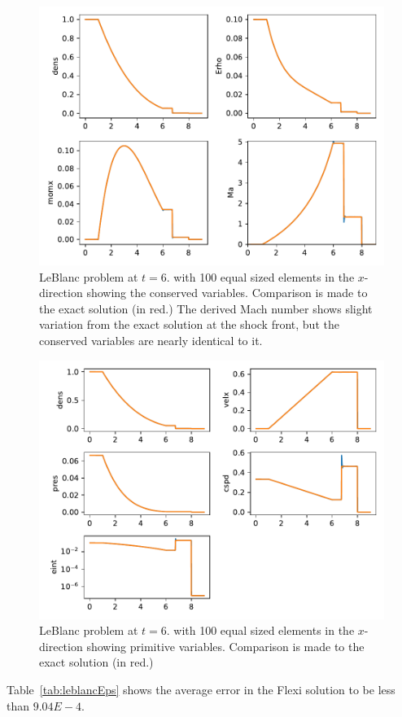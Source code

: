 \begin{figure}[h!]
 \centering
 \includegraphics[scale=0.8]{figures/leblanc-CV.pdf}
 \caption{LeBlanc problem at $t = 6.$ with 100 equal sized elements in the $x$-direction showing the conserved variables.  Comparison is made to the exact solution (in red.)  The derived Mach number shows slight variation from the exact solution at the shock front, but the conserved variables are nearly identical to it.}
 \label{fig:CVleblanc}
\end{figure}

\begin{figure}[h!]
 \centering
 \includegraphics[scale=0.8]{figures/leblanc-PV.pdf}
 \caption{LeBlanc problem at $t = 6.$ with 100 equal sized elements in the $x$-direction showing primitive variables.  Comparison is made to the exact solution (in red.)}
 \label{fig:PVleblanc}
\end{figure}
\noindent Table~\ref{tab:leblancEps} shows the average error in the Flexi solution to be less than $9.04E-4$.

